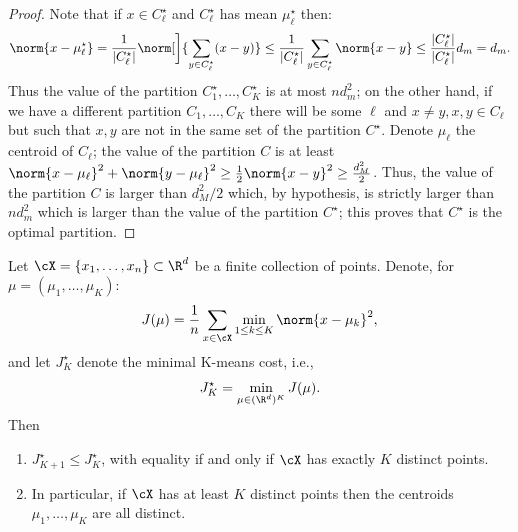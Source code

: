 \begin{proof}
Note that if $x \in C_\ell^\star$ and $C_\ell^\star$ has mean $\mu_\ell^\star$
then:
\begin{equation}\label{eq:ch8-mean-bound}
\norm{x - \mu_\ell^\star}
= \frac{1}{|C_\ell^\star|} \norm[\bigg]{\sum_{y \in C_\ell^\star} (x - y)}
\le \frac{1}{|C_\ell^\star|} \sum_{y \in C_\ell^\star} \norm{x - y}
\le \frac{|C_\ell^\star|}{|C_\ell^\star|} d_m = d_m.
\end{equation}
Thus the value of the partition $C_1^\star, \ldots, C_K^\star$ is at most
$n d_m^2$; on the other hand, if we have a different partition $C_1, \ldots, C_K$
there will be some $\ell$ and $x \neq y, x, y \in C_\ell$ but such that $x, y$
are not in the same set of the partition $C^\star$. Denote $\mu_\ell$ the
centroid of $C_\ell$; the value of the partition $C$ is at least
$\norm{x - \mu_\ell}^2 + \norm{y - \mu_\ell}^2 \ge \frac{1}{2} \norm{x - y}^2
\ge \frac{d_M^2}{2}$. Thus, the value of the partition $C$ is larger than
$d_M^2 / 2$ which, by hypothesis, is strictly larger than $n d_m^2$ which is
larger than the value of the partition $C^\star$; this proves that $C^\star$
is the optimal partition.
\end{proof}

\begin{lemma}
Let $\cX = \{x_1, \ldots, x_n\} \subset \R^d$ be a finite collection of points.
Denote, for $\mu = (\mu_1, \ldots, \mu_K)$:
\begin{equation}\label{eq:ch8-Jmu}
J(\mu) = \frac{1}{n} \sum_{x \in \cX} \min_{1 \le k \le K} \norm{x - \mu_k}^2,
\end{equation}
and let $J_K^\star$ denote the minimal K-means cost, i.e.,
\begin{equation}\label{eq:ch8-JKstar}
J_K^\star = \min_{\mu \in (\R^d)^K} J(\mu).
\end{equation}
Then
\begin{enumerate}
    \item $J_{K+1}^\star \le J_K^\star$, with equality if and only if $\cX$
    has exactly $K$ distinct points.
    \item In particular, if $\cX$ has at least $K$ distinct points then the
    centroids $\mu_1, \ldots, \mu_K$ are all distinct.
\end{enumerate}
\end{lemma}


